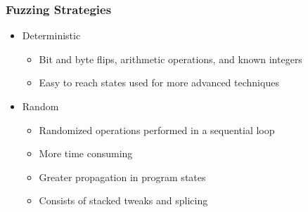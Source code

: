 \begin{frame}
\frametitle{Fuzzing Strategies}
\begin{itemize}

\item{Deterministic}
	\begin{itemize}
	\item{Bit and byte flips, arithmetic operations, and known integers}
	\item{Easy to reach states used for more advanced techniques}
	\end{itemize}

\item{Random}
	\begin{itemize}
	\item{Randomized operations performed in a sequential loop}
	\item{More time consuming}
	\item{Greater propagation in program states}
	\item{Consists of stacked tweaks and splicing}
	\end{itemize}

\end{itemize}

\end{frame}
